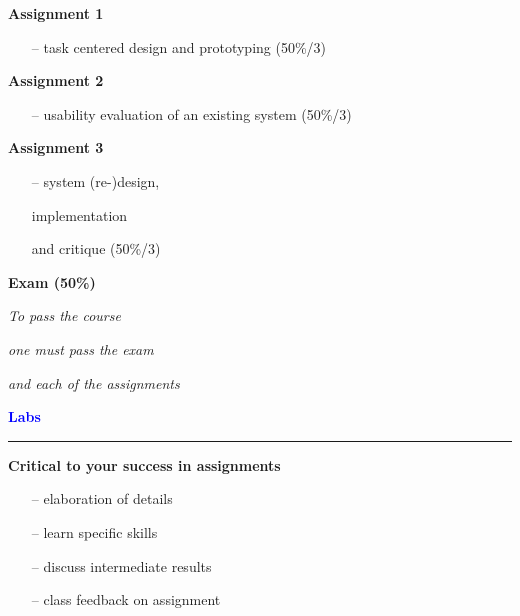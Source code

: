 \documentclass[pdf]{beamer}
\begin{document}
{{{{{{{{\begin{frame}
    \bigskip
    \textbf {Assignment 1}
    \begin{itemize}
    	\item[{--}] task centered design and prototyping (50\%/3)
    \end{itemize}
    \bigskip
    \textbf {Assignment 2}
    \begin{itemize}
        \item[{--}] usability evaluation of an existing system (50\%/3) 
    \end{itemize}
     \bigskip
    \textbf {Assignment 3}
    \begin{itemize}
        \item[{--}] system (re-)design, 

implementation 

and critique (50\%/3) 
    \end{itemize}
    \bigskip
    \bigskip
    \textbf {Exam (50\%)}
    
    \textit {To pass the course}
    
	\textit	{one must pass the exam}
    
	\textit {and each of the assignments}
\end{frame}}



{
\begin{frame}
	\vspace{8mm}
	\textcolor{Blue}{\textbf{\Large{Labs}}}
    \textcolor{red}{\rule{10cm}{1mm}}
 
    \bigskip
    \textbf {Critical to your success in assignments}
    \begin{itemize}
    	\item[{--}] elaboration of details
        \item[{--}] learn specific skills 
        \item[{--}] discuss intermediate results
        \item[{--}] class feedback on assignment 


\end{itemize}
\end{frame}}}}}}}}}
\end{document}

